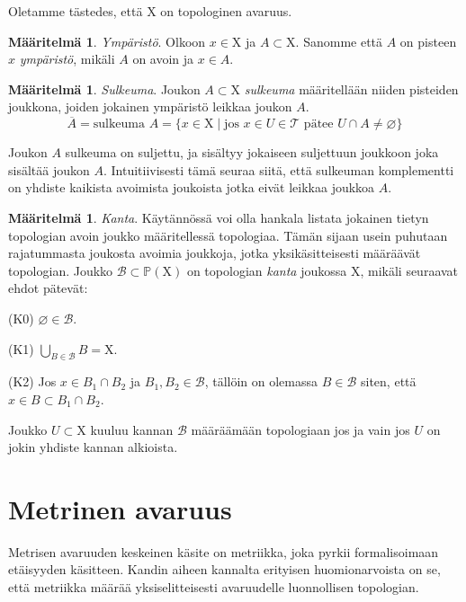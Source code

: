\documentclass[12pt,a4paper,leqno]{report}
\newcommand{\X}{\mathrm{X}}
\newcommand{\Pow}{\mathbb{P}}
\newcommand{\B}{\mathcal{B}}
\newcommand{\T}{\mathcal{T}}
\theoremstyle{plain}
\theoremstyle{definition}
\newtheorem{maar}[equation]{Määritelmä}
\theoremstyle{remark}
\begin{document}
Oletamme tästedes, että $\X$ on topologinen avaruus.

\begin{maar}\label{ymp}
\emph{Ympäristö}. Olkoon $x \in \X$ ja $A \subset \X$. Sanomme että $A$ on pisteen $x$ \emph{ympäristö}, mikäli $A$ on avoin ja $x \in A$.
\end{maar}

\begin{maar}\label{sulk}
\emph{Sulkeuma}. Joukon $A \subset \X$ \emph{sulkeuma} määritellään niiden pisteiden joukkona, joiden jokainen ympäristö leikkaa joukon $A$.
\begin{equation}
\overline{A} = \text{sulkeuma }A = \{ x \in \X \mid \text{jos } x \in U \in \T \text{ pätee } U \cap A \not= \varnothing \}
\end{equation}
\end{maar}

Joukon $A$ sulkeuma on suljettu, ja sisältyy jokaiseen suljettuun joukkoon joka sisältää joukon $A$. Intuitiivisesti tämä seuraa siitä, että sulkeuman komplementti on yhdiste kaikista avoimista joukoista jotka eivät leikkaa joukkoa $A$.

\begin{maar}\label{kantamaar}
\emph{Kanta}. Käytännössä voi olla hankala listata jokainen tietyn topologian avoin joukko määritellessä topologiaa. Tämän sijaan usein puhutaan rajatummasta joukosta avoimia joukkoja, jotka yksikäsitteisesti määräävät topologian. Joukko $\B \subset \Pow(\X)$ on topologian \emph{kanta} joukossa $\X$, mikäli seuraavat ehdot pätevät:

(K0) $\varnothing \in \B$.

(K1) $\bigcup_{B \in \B} B = \X$.

(K2) Jos $x \in B_1 \cap B_2$ ja $B_1,B_2\in \B$, tällöin on olemassa $B \in \B$ siten, että $x \in B \subset B_1 \cap B_2$.
\end{maar}

Joukko $U \subset \X$ kuuluu kannan $\B$ määräämään topologiaan jos ja vain jos $U$ on jokin yhdiste kannan alkioista.

\chapter{Metrinen avaruus}\label{MET}

Metrisen avaruuden keskeinen käsite on metriikka, joka pyrkii formalisoimaan etäisyyden käsitteen. Kandin aiheen kannalta erityisen huomionarvoista on se, että metriikka määrää yksiselitteisesti avaruudelle luonnollisen topologian.
\end{document}
